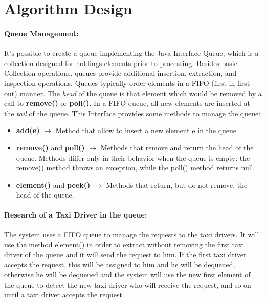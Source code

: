 \chapter{Algorithm Design} \label{chap3}
\subsubsection{Queue Management:}
It's possible to create a queue implementing the Java Interface Queue, which is a collection designed for holdings elements prior to processing. Besides basic Collection operations, queues provide additional insertion, extraction, and inspection operations. Queues typically order elements in a FIFO (first-in-first-out) manner. The \textit{head} of the queue is that element which would be removed by a call to \textbf{remove()} or \textbf{poll()}. In a FIFO queue, all new elements are inserted at the \textit{tail} of the queue.
This Interface provides some methods to manage the queue:
\begin{itemize}
	\item \textbf{add(e)} $\rightarrow$ Method that allow to insert a new element e in the queue
	\item \textbf{remove()} and \textbf{poll()} $\rightarrow$ Methods that remove and return the head of the queue. Methods differ only in their behavior when the queue is empty: the remove() method throws an exception, while the poll() method returns null.
	\item \textbf{element()} and \textbf{peek()} $\rightarrow$ Methods that return, but do not remove, the head of the queue.
\end{itemize}

\subsubsection{Research of a Taxi Driver in the queue:}
The system uses a FIFO queue to manage the requests to the taxi drivers. It will use the method element() in order to extract without removing the first taxi driver of the queue and it will send the request to him. If the first taxi driver accepts the request, this will be assigned to him and he will be dequeued, otherwise he will be dequeued and the system will use the new first element of the queue to detect the new taxi driver who will receive the request, and so on until a taxi driver accepts the request.

